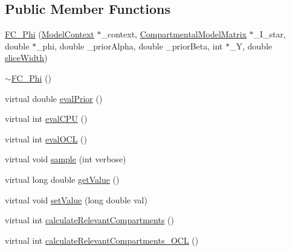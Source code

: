\subsection*{Public Member Functions}
\begin{DoxyCompactItemize}
\item 
\hyperlink{classSpatialSEIR_1_1FC__Phi_afa42036238ea301db57410a08da92d8f}{F\-C\-\_\-\-Phi} (\hyperlink{classSpatialSEIR_1_1ModelContext}{Model\-Context} $\ast$\-\_\-context, \hyperlink{classSpatialSEIR_1_1CompartmentalModelMatrix}{Compartmental\-Model\-Matrix} $\ast$\-\_\-\-I\-\_\-star, double $\ast$\-\_\-phi, double \-\_\-prior\-Alpha, double \-\_\-prior\-Beta, int $\ast$\-\_\-\-Y, double \hyperlink{classSpatialSEIR_1_1FullConditional_a150ee031af8d086ad0a04b13630a110f}{slice\-Width})
\item 
\hyperlink{classSpatialSEIR_1_1FC__Phi_ab83a41edc6b119b0bf94105c929863ee}{$\sim$\-F\-C\-\_\-\-Phi} ()
\item 
virtual double \hyperlink{classSpatialSEIR_1_1FC__Phi_aa7773cd1f79ac2cc0aa0022b871be037}{eval\-Prior} ()
\item 
virtual int \hyperlink{classSpatialSEIR_1_1FC__Phi_a282b0c3778149a8f29364ff56543288d}{eval\-C\-P\-U} ()
\item 
virtual int \hyperlink{classSpatialSEIR_1_1FC__Phi_aa0683e5c52d7cfdaf106fe9d20348845}{eval\-O\-C\-L} ()
\item 
virtual void \hyperlink{classSpatialSEIR_1_1FC__Phi_ad01626131955f37c6abec78af34524dd}{sample} (int verbose)
\item 
virtual long double \hyperlink{classSpatialSEIR_1_1FC__Phi_a78d2ad18fd2696bdd91333b1b4d8984e}{get\-Value} ()
\item 
virtual void \hyperlink{classSpatialSEIR_1_1FC__Phi_a71c23b1ea81880634e867786569b8b26}{set\-Value} (long double val)
\item 
virtual int \hyperlink{classSpatialSEIR_1_1FC__Phi_a738d592a5efd1f6181b28b2f294d4f86}{calculate\-Relevant\-Compartments} ()
\item 
virtual int \hyperlink{classSpatialSEIR_1_1FC__Phi_acb391933ee8f5efd16d392b62d400933}{calculate\-Relevant\-Compartments\-\_\-\-O\-C\-L} ()
\end{DoxyCompactItemize}
